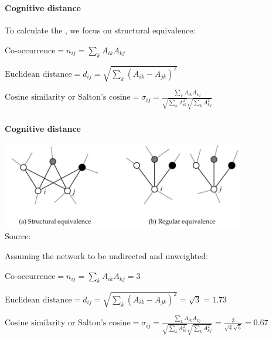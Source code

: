\documentclass[8pt]{beamer}
\begin{document}

\begin{frame}
\frametitle{\insertsection}
\framesubtitle{Cognitive distance}

To calculate the {\color{blue}{weight of cognitive connections}}, we focus on structural equivalence:

\bigskip

$\text{Co-occurrence} = n_{ij} = \sum_k A_{ik}A_{kj}$

\bigskip
  
$\text{Euclidean distance} = d_{ij} = \sqrt{\sum_k (A_{ik} - A_{jk})^2}$

\bigskip

$\text{Cosine similarity or Salton's cosine} = \sigma_{ij} = \frac{\sum_k A_{ik}A_{kj}}{\sqrt{\sum_k A_{ik}^{2}}\sqrt{\sum_k A_{kj}^{2}}}$


\end{frame}


\begin{frame}
\frametitle{\insertsection}
\framesubtitle{Cognitive distance}

\begin{center}
\includegraphics[width = 0.8\textwidth]{equivalence}\\
{\tiny Source: \cite{Newman2010}}
\end{center}

\medskip

Assuming the network to be undirected and unweighted:

\bigskip
 
$\text{Co-occurrence} = n_{ij} = \sum_k A_{ik}A_{kj} = 3$
	
\bigskip
  
$\text{Euclidean distance} = d_{ij} = \sqrt{\sum_k (A_{ik} - A_{jk})^2} = \sqrt{3} = 1.73$

\bigskip

$\text{Cosine similarity or Salton's cosine} = \sigma_{ij} = \frac{\sum_k A_{ik}A_{kj}}{\sqrt{\sum_k A_{ik}^{2}}\sqrt{\sum_k A_{kj}^{2}}} = \frac{3}{\sqrt{4}\sqrt{5}}=0.67 $

\end{frame}
\end{document}
